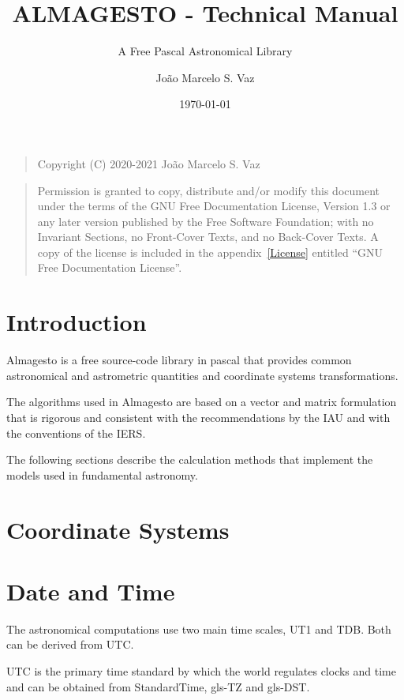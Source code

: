 \documentclass[a4paper,11pt,bibliography=totoc]{scrreport}
\title{ALMAGESTO - Technical Manual}
\subtitle{A Free Pascal Astronomical Library}
\author{João Marcelo S. Vaz}
\date{\today}
\begin{document}
	
\maketitle
{}
\begin{quote}    
Copyright (C) 2020-2021 João Marcelo S. Vaz
\end{quote}
\begin{quote} 
Permission is granted to copy, distribute and/or modify this document under the terms of the GNU Free Documentation License, Version 1.3 or any later version published by the Free Software Foundation; with no Invariant Sections, no Front-Cover Texts, and no Back-Cover Texts. A copy of the license is included in the appendix~\ref{License} entitled ``GNU Free Documentation License''.
\end{quote}
	
\tableofcontents
\printglossary[type=\acronymtype,title=List of Abbreviations]

	
\clearpage
{}
\chapter{Introduction}\label{Introduction}

Almagesto is a free source-code library in pascal that provides common astronomical and astrometric quantities and coordinate systems transformations.

The algorithms used in Almagesto are based on a vector and matrix formulation that is rigorous and consistent with the recommendations by the \gls{IAU} and with the conventions of the \gls{IERS}.

The following sections describe the calculation methods that implement the models used in fundamental astronomy.

\chapter{Coordinate Systems}\label{CoordinateSystems}

\chapter{Date and Time}\label{TimeScales}

The astronomical computations use two main time scales, \gls{UT1} and \gls{TDB}. Both can be derived from \gls{UTC}.

\gls{UTC} is the primary time standard by which the world regulates clocks and time and can be obtained from \gls{StandardTime}, \gls{gls-TZ} and \gls{gls-DST}.
\end{document}
